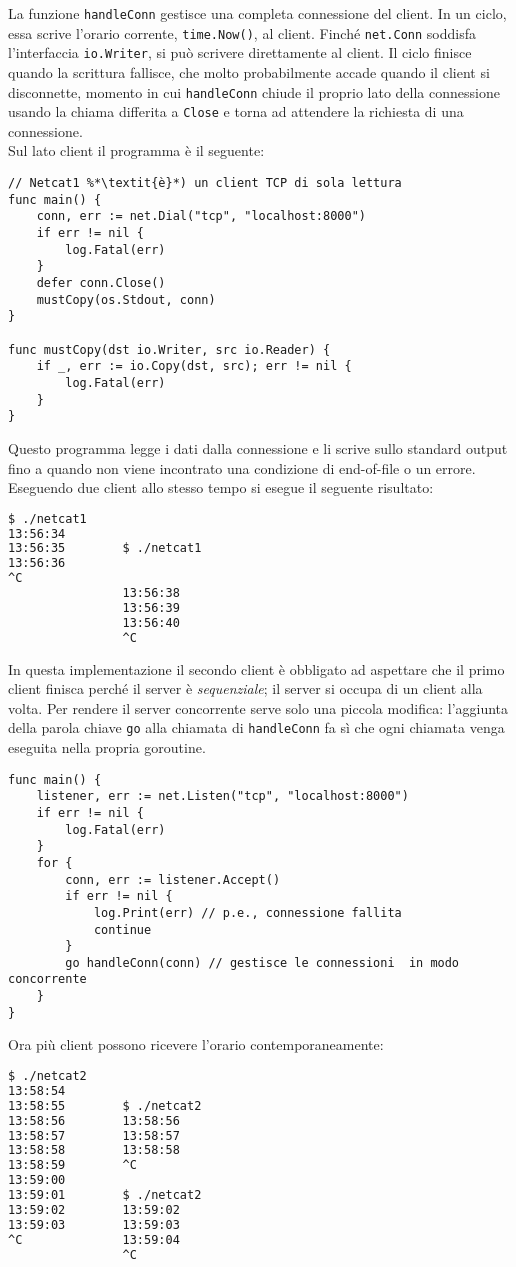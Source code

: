 \documentclass[../../thesis.tex]{subfiles}
\begin{document}
    La funzione \verb"handleConn" gestisce una completa connessione del client.
    In un ciclo, essa scrive l'orario corrente, \verb"time.Now()", al client.
    Finché \verb"net.Conn" soddisfa l'interfaccia \verb"io.Writer", si può scrivere direttamente al client.
    Il ciclo finisce quando la scrittura fallisce, che molto probabilmente accade quando il client si disconnette, momento in cui \verb"handleConn" chiude il proprio lato della connessione usando la chiama differita a \verb"Close" e torna ad attendere la richiesta di una connessione. \\
    Sul lato client il programma è il seguente:
    \begin{lstlisting}[frame = single, label = {lst:lstlisting7-2.2}]
// Netcat1 %*\textit{è}*) un client TCP di sola lettura
func main() {
    conn, err := net.Dial("tcp", "localhost:8000")
    if err != nil {
        log.Fatal(err)
    }
    defer conn.Close()
    mustCopy(os.Stdout, conn)
}

func mustCopy(dst io.Writer, src io.Reader) {
    if _, err := io.Copy(dst, src); err != nil {
        log.Fatal(err)
    }
}
    \end{lstlisting}
    Questo programma legge i dati dalla connessione e li scrive sullo standard output fino a quando non viene incontrato una condizione di end-of-file o un errore.
    Eseguendo due client allo stesso tempo si esegue il seguente risultato:
    \begin{lstlisting}[language = bash, frame = L, label = {lst:lstlisting7-2.3}]
$ ./netcat1
13:56:34
13:56:35        $ ./netcat1
13:56:36
^C
                13:56:38
                13:56:39
                13:56:40
                ^C
    \end{lstlisting}
    In questa implementazione il secondo client è obbligato ad aspettare che il primo client finisca perché il server è \textit{sequenziale}; il server si occupa di un client alla volta.
    Per rendere il server concorrente serve solo una piccola modifica: l'aggiunta della parola chiave \verb"go" alla chiamata di \verb"handleConn" fa sì che ogni chiamata venga eseguita nella propria goroutine.
    \begin{lstlisting}[frame = single, label = {lst:lstlisting7-2.4}]
func main() {
    listener, err := net.Listen("tcp", "localhost:8000")
    if err != nil {
        log.Fatal(err)
    }
    for {
        conn, err := listener.Accept()
        if err != nil {
            log.Print(err) // p.e., connessione fallita
            continue
        }
        go handleConn(conn) // gestisce le connessioni  in modo concorrente
    }
}
    \end{lstlisting}
    Ora più client possono ricevere l'orario contemporaneamente:
    \begin{lstlisting}[language = bash, frame = L, label = {lst:lstlisting7-2.5}]
$ ./netcat2
13:58:54
13:58:55        $ ./netcat2
13:58:56        13:58:56
13:58:57        13:58:57
13:58:58        13:58:58
13:58:59        ^C
13:59:00
13:59:01        $ ./netcat2
13:59:02        13:59:02
13:59:03        13:59:03
^C              13:59:04
                ^C
    \end{lstlisting}
\end{document}
